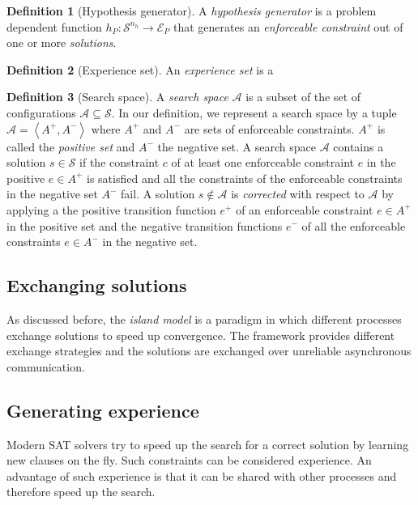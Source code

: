 \documentclass[a4paper,10pt]{article}
\newcommand{\seclab}[1]{\label{sec:#1}}
\newcommand{\tupl}[1]{\ensuremath{\left\langle #1 \right\rangle}}
\newcommand{\calS}{\ensuremath{\mathcal{S}}}
\newcommand{\calE}{\ensuremath{\mathcal{E}}}
\newcommand{\calA}{\ensuremath{\mathcal{A}}}
\theoremstyle{definition}
\newtheorem{definition}{Definition}
\begin{document}
\begin{definition}[Hypothesis generator]
A \emph{hypothesis generator} is a problem dependent function $h_P:\calS^{n_h}\rightarrow\calE_P$ that generates an \emph{enforceable constraint} out of one or more \emph{solutions}.
\end{definition}

\begin{definition}[Experience set]
An \emph{experience set} is a 
\end{definition}

\begin{definition}[Search space]
A \emph{search space} $\calA$ is a subset of the set of configurations $\calA\subseteq\calS$. In our definition, we represent a search space by a tuple $\calA=\tupl{A^+,A^-}$ where $A^+$ and $A^-$ are sets of enforceable constraints. $A^+$ is called the \emph{positive set} and $A^-$ the negative set. A search space $\calA$ contains a solution $s\in\calS$ if the constraint $c$ of at least one enforceable constraint $e$ in the positive $e\in A^+$ is satisfied and all the constraints of the enforceable constraints in the negative set $A^-$ fail. A solution $s\notin\calA$ is \emph{corrected} with respect to $\calA$ by applying a the positive transition function $e^+$ of an enforceable constraint $e\in A^+$ in the positive set and the negative transition functions $e^-$ of all the enforceable constraints $e\in A^-$ in the negative set.
\end{definition}

\subsection{Exchanging solutions}
\seclab{exchangingsolutions}
As discussed before, the \emph{island model}\cite{} is a paradigm in which different processes exchange solutions to speed up convergence. The framework provides different exchange strategies and the solutions are exchanged over unreliable asynchronous communication.%

\subsection{Generating experience}
\seclab{generatingexperience}
Modern SAT solvers try to speed up the search for a correct solution by learning new clauses on the fly. Such constraints can be considered experience. An advantage of such experience is that it can be shared with other processes and therefore speed up the search.
\end{document}
